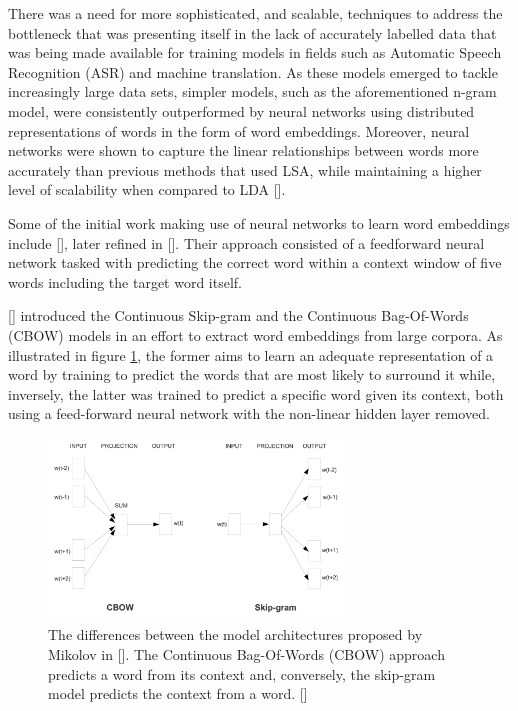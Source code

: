 \documentclass[12pt, a4paper]{report}
\theoremstyle{definition}
\theoremstyle{definition}%
\theoremstyle{definition}%
\theoremstyle{definition}%
\theoremstyle{definition}%
\theoremstyle{definition}%
\renewcommand{\cite}[1]{[\citealp{#1}]}
\begin{document}
There was a need for more sophisticated, and scalable, techniques to address the bottleneck that was presenting itself in the lack of accurately labelled data that was being made available for training models in fields such as Automatic Speech Recognition (ASR) and machine translation. As these models emerged to tackle increasingly large data sets, simpler models, such as the aforementioned n-gram model, were consistently outperformed by neural networks using distributed representations of words in the form of word embeddings. Moreover, neural networks were shown to capture the linear relationships between words more accurately than previous methods that used LSA, while maintaining a higher level of scalability when compared to LDA \cite{mikolov2013}.

Some of the initial work making use of neural networks to learn word embeddings include \cite{collobert2008}, later refined in \cite{collobert2011}. Their approach consisted of a feedforward neural network tasked with predicting the correct word within a context window of five words including the target word itself.

\cite{mikolov2013} introduced the Continuous Skip-gram and the Continuous Bag-Of-Words (CBOW) models in an effort to extract word embeddings from large corpora. As illustrated in figure \ref{fig:cbow_vs_skipgram}, the former aims to learn an adequate representation of a word by training to predict the words that are most likely to surround it while, inversely, the latter was trained to predict a specific word given its context, both using a feed-forward neural network with the non-linear hidden layer removed.

\begin{figure}[!ht]
	\centering
	\includegraphics[width=0.7\textwidth]{./figures/cbow_vs_skipgram.png}
	\caption{The differences between the model architectures proposed by Mikolov in \cite{mikolov2013}. The Continuous Bag-Of-Words (CBOW) approach predicts a word from its context and, conversely, the skip-gram model predicts the context from a word. \cite{mikolov2013b}}
	\label{fig:cbow_vs_skipgram}
\end{figure}
\end{document}
